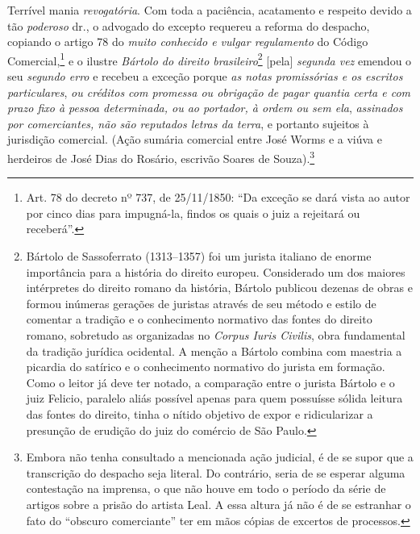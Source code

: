 {Terrível mania \emph{revogatória}. Com toda a paciência, acatamento e
respeito devido a tão \emph{poderoso} dr., o advogado do excepto
requereu a reforma do despacho, copiando o artigo 78 do \emph{muito
conhecido e vulgar regulamento} do Código Comercial,\footnote{ Art. 78
  do decreto nº 737, de 25/11/1850: ``Da exceção se dará vista ao autor
  por cinco dias para impugná-la, findos os quais o juiz a rejeitará ou
  receberá''.} e o ilustre \emph{Bártolo do direito
brasileiro}\footnote{ Bártolo de Sassoferrato (1313--1357) foi um
  jurista italiano de enorme importância para a história do direito
  europeu. Considerado um dos maiores intérpretes do direito romano da
  história, Bártolo publicou dezenas de obras e formou inúmeras gerações
  de juristas através de seu método e estilo de comentar a tradição e o
  conhecimento normativo das fontes do direito romano, sobretudo as
  organizadas no \emph{Corpus Iuris Civilis}, obra fundamental da
  tradição jurídica ocidental. A menção a Bártolo combina com maestria a
  picardia do satírico e o conhecimento normativo do jurista em
  formação. Como o leitor já deve ter notado, a comparação entre o
  jurista Bártolo e o juiz Felicio, paralelo aliás possível apenas para
  quem possuísse sólida leitura das fontes do direito, tinha o nítido
  objetivo de expor e ridicularizar a presunção de erudição do juiz do
  comércio de São Paulo.} {[}pela{]} \emph{segunda vez} emendou o seu
\emph{segundo erro} e recebeu a exceção porque \emph{as notas
promissórias e os escritos particulares}, \emph{ou créditos com promessa
ou obrigação de pagar quantia certa e com prazo fixo à pessoa
determinada, ou ao portador, à ordem ou sem ela}, \emph{assinados por
comerciantes, não são reputados letras da terra}, e portanto sujeitos à
jurisdição comercial. (Ação sumária comercial entre José Worms e a viúva
e herdeiros de José Dias do Rosário, escrivão Soares de
Souza).\footnote{ Embora não tenha consultado a mencionada ação
  judicial, é de se supor que a transcrição do despacho seja literal. Do
  contrário, seria de se esperar alguma contestação na imprensa, o que
  não houve em todo o período da série de artigos sobre a prisão do
  artista Leal. A essa altura já não é de se estranhar o fato do
  ``obscuro comerciante'' ter em mãos cópias de excertos de processos.}

}
